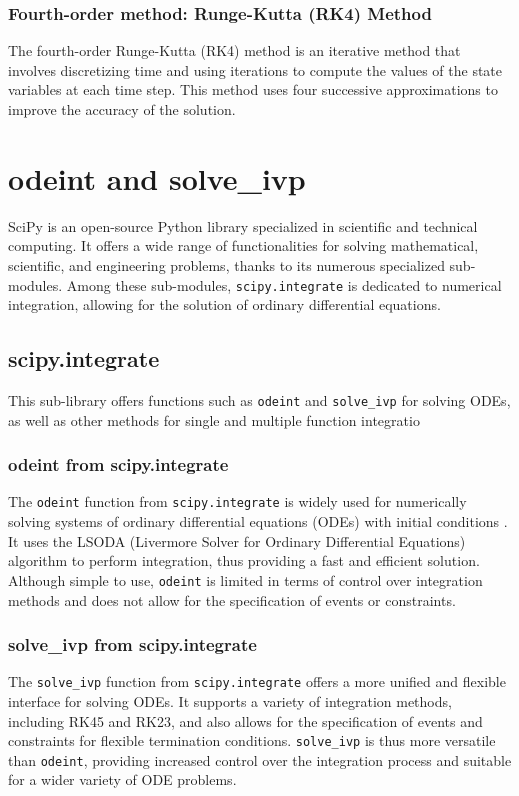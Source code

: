 \documentclass{article}
\begin{document}
\subsubsection{Fourth-order method: Runge-Kutta (RK4) Method}
The fourth-order Runge-Kutta (RK4) method is an iterative method that involves discretizing 
time and using iterations to compute the values of the state variables at each time step. 
This method uses four successive approximations to improve the accuracy of the solution. 

\section{odeint and solve\_ivp}
SciPy is an open-source Python library specialized in scientific and technical computing. It offers a wide range of functionalities for solving mathematical, scientific, and engineering problems, thanks to its numerous specialized sub-modules. Among these sub-modules, \texttt{scipy.integrate} is dedicated to numerical integration, allowing for the solution of ordinary differential equations.
\subsection{scipy.integrate}
This sub-library offers functions such as \texttt{odeint} and \texttt{solve\_ivp} for solving ODEs, as well as other methods for single and multiple function integratio
\subsubsection{odeint from scipy.integrate}
The \texttt{odeint} function from \texttt{scipy.integrate} is widely used for numerically solving systems of ordinary differential equations (ODEs) with initial conditions \cite{scipy_ode}. It uses the LSODA (Livermore Solver for Ordinary Differential Equations) algorithm to perform integration, thus providing a fast and efficient solution. Although simple to use, \texttt{odeint} is limited in terms of control over integration methods and does not allow for the specification of events or constraints.
\subsubsection{solve\_ivp from scipy.integrate}
The \texttt{solve\_ivp} function from \texttt{scipy.integrate} offers a more unified and flexible interface for solving ODEs. It supports a variety of integration methods, including RK45 and RK23, and also allows for the specification of events and constraints for flexible termination conditions. \texttt{solve\_ivp} is thus more versatile than \texttt{odeint}, providing increased control over the integration process and suitable for a wider variety of ODE problems.
\end{document}
